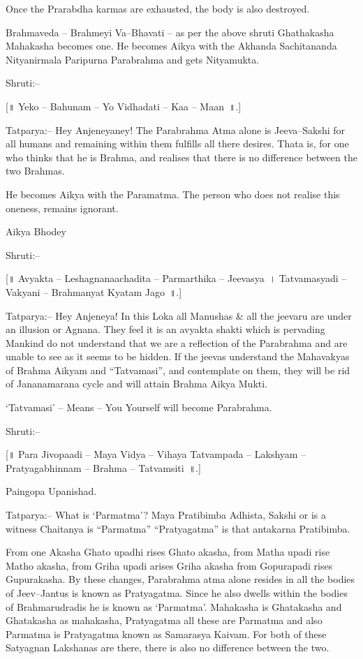 Once the Prarabdha karmas are exhausted, the body is also destroyed.

Brahmaveda – Brahmeyi Va–Bhavati – as per the above shruti Ghathakasha Mahakasha becomes one. He becomes Aikya with the Akhanda Sachitananda Nityanirmala Paripurna Parabrahma and gets Nityamukta.

Shruti:–

[॥ Yeko – Bahunam – Yo Vidhadati – Kaa – Maan~॥.]

Tatparya:– Hey Anjeneyaney! The Parabrahma Atma alone is Jeeva–Sakshi for all humans and remaining within them fulfills all there desires. Thata is, for one who thinks that he is Brahma, and realises that there is no difference between the two Brahmas.

He becomes Aikya with the Paramatma. The person who does not realise this oneness, remains ignorant.

Aikya Bhodey

Shruti:–

[॥ Avyakta – Leshagnanaachadita – Parmarthika – Jeevasya~। Tatvamasyadi – Vakyani – Brahmanyat Kyatam Jago~॥.]

Tatparya:– Hey Anjeneya! In this Loka all Manushas \& all the jeevaru are under an illusion or Agnana. They feel it is an avyakta shakti which is pervading Mankind do not understand that we are a reflection of the Parabrahma and are unable to see as it seems to be hidden. If the jeevas understand the Mahavakyas of Brahma Aikyam and “Tatvamasi”, and contemplate on them, they will be rid of Jananamarana cycle and will attain Brahma Aikya Mukti.

‘Tatvamasi’ – Means – You Yourself will become Parabrahma.

Shruti:–

[॥ Para Jivopaadi – Maya Vidya – Vihaya Tatvampada – Lakshyam – Pratyagabhinnam – Brahma – Tatvamsiti~॥.]

Paingopa Upanishad.

Tatparya:– What is ‘Parmatma’? Maya Pratibimba Adhista, Sakshi or is a witness Chaitanya is “Parmatma” “Pratyagatma” is that antakarna Pratibimba.

From one Akasha Ghato upadhi rises Ghato akasha, from Matha upadi rise Matho akasha, from Griha upadi arises Griha akasha from Gopurapadi rises Gupurakasha. By these changes, Parabrahma atma alone resides in all the bodies of Jeev–Jantus is known as Pratyagatma. Since he also dwells within the bodies of Brahmarudradis he is known as ‘Parmatma’. Mahakasha is Ghatakasha and Ghatakasha as mahakasha, Pratyagatma all these are Parmatma and also Parmatma is Pratyagatma known as Samarasya Kaivam. For both of these Satyagnan Lakshanas are there, there is also no difference between the two.

